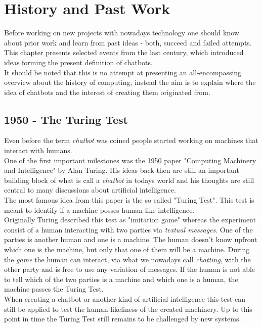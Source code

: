 \chapter{History and Past Work}


Before working on new projects with nowadays technology one should know about prior work and learn from past ideas - both, succeed and failed attempts.
\\
This chapter presents selected events from the last century, which introduced ideas forming the present definition of chatbots.
\\
It should be noted that this is no attempt at presenting an all-encompassing overview about the history of computing, instead the aim is to explain where the idea of chatbots and the interest of creating them originated from.


\section{1950 - The Turing Test}

Even before the term \emph{chatbot} was coined people started working on machines that interact with humans.
\\
One of the first important milestones was the 1950 paper "Computing Machinery and Intelligence" by Alan Turing\cite{turing}. His ideas back then are still an important building block of what is call a \emph{chatbot} in todays world and his thoughts are still central to many discussions about artificial intelligence.
\\
The most famous idea from this paper is the so called "Turing Test". This test is meant to identify if a machine posses human-like intelligence.
\\
Originally Turing described this test as "imitation game" whereas the experiment consist of a human interacting with two parties via \emph{textual messages}. One of the parties is another human and one is a machine. The human doesn't know upfront which one is the machine, but only that one of them will be a machine. During the \emph{game} the human can interact, via what we nowadays call \emph{chatting}, with the other party and is free to use any variation of messages. If the human is not able to tell which of the two parties is a machine and which one is a human, the machine passes the Turing Test.
\\
When creating a chatbot or another kind of artificial intelligence this test can still be applied to test the human-likeliness of the created machinery. Up to this point in time the Turing Test still remains to be challenged by new systems.


